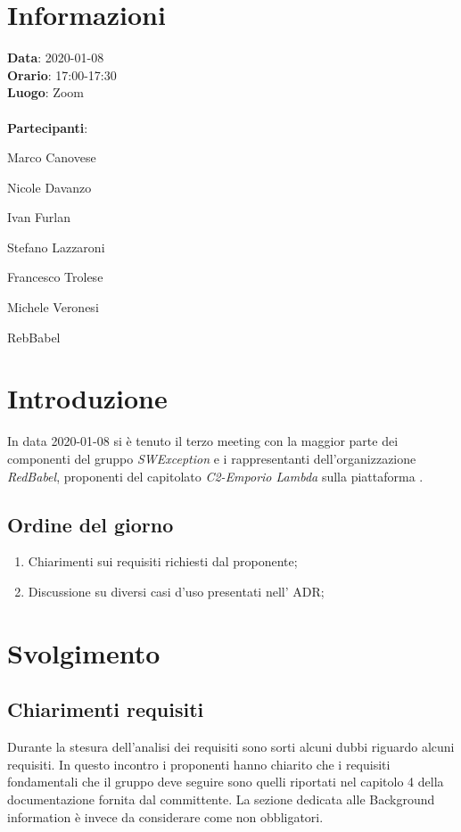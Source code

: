 \section{Informazioni}
\textbf{Data}: 2020-01-08\\
\textbf{Orario}: 17:00-17:30\\
\textbf{Luogo}: Zoom\\\\
\textbf{Partecipanti}:\begin{list}{*}{\setlength{\itemsep}{0cm}}
	\item Marco Canovese
	\item Nicole Davanzo
	\item Ivan Furlan
	\item Stefano Lazzaroni
	\item Francesco Trolese
	\item Michele Veronesi
	\item RebBabel
\end{list}

\section{Introduzione}
In data 2020-01-08 si è tenuto il terzo meeting con la maggior parte dei componenti del gruppo \textit{SWException} e i rappresentanti dell'organizzazione \textit{RedBabel}, proponenti del capitolato \textit{C2-Emporio Lambda} sulla piattaforma . \\

\subsection{Ordine del giorno}
\begin{enumerate}
    \item Chiarimenti sui requisiti richiesti dal proponente;
    \item Discussione su diversi casi d'uso presentati nell' ADR;
\end{enumerate}

\section{Svolgimento}

\subsection{Chiarimenti requisiti}
Durante la stesura dell'analisi dei requisiti sono sorti alcuni dubbi riguardo alcuni requisiti.
In questo incontro i proponenti hanno chiarito che i requisiti fondamentali che il gruppo deve seguire sono quelli riportati nel capitolo 4 della documentazione fornita dal committente.
La sezione dedicata alle Background information è invece da considerare come non obbligatori.

